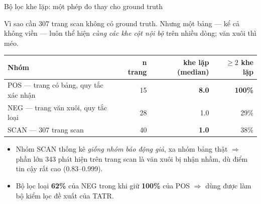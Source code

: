 \documentclass[aspectratio=169,11pt]{beamer}
\begin{document}
\begin{frame}{Bộ lọc khe lặp: một phép đo thay cho ground truth}
  \begin{block}{\small Vì sao cần}
    307 trang scan không có ground truth. Nhưng một bảng --- kể cả không viền ---
    luôn thể hiện \emph{cùng các khe cột nội bộ} trên nhiều dòng; văn xuôi thì méo.
  \end{block}
  \centering
  {\footnotesize
  \begin{tabular}{@{}l r r r@{}}
    \toprule
    \textbf{Nhóm} & \textbf{n trang} & \textbf{khe lặp (median)} & \textbf{\(\ge 2\) khe lặp} \\
    \midrule
    POS --- trang có bảng, quy tắc xác nhận & 15 & \textbf{8.0} & \textbf{100\%} \\
    NEG --- trang văn xuôi, quy tắc loại & 28 & 1.0 & 29\% \\
    SCAN --- 307 trang scan & 40 & \textbf{1.0} & 38\% \\
    \bottomrule
  \end{tabular}}
  \vspace{0.5em}
  \begin{itemize}\footnotesize
    \item Nhóm SCAN thống kê \emph{giống nhóm báo động giả}, xa nhóm bảng thật $\Rightarrow$
          phần lớn 343 phát hiện trên trang scan là văn xuôi bị nhận nhầm, dù điểm
          tin cậy rất cao (0.83--0.999).
    \item Bộ lọc loại \textbf{62\%} của NEG trong khi giữ \textbf{100\%} của POS
          $\Rightarrow$ dùng được làm bộ kiểm lọc đề xuất của TATR.
  \end{itemize}
\end{frame}
\end{document}
